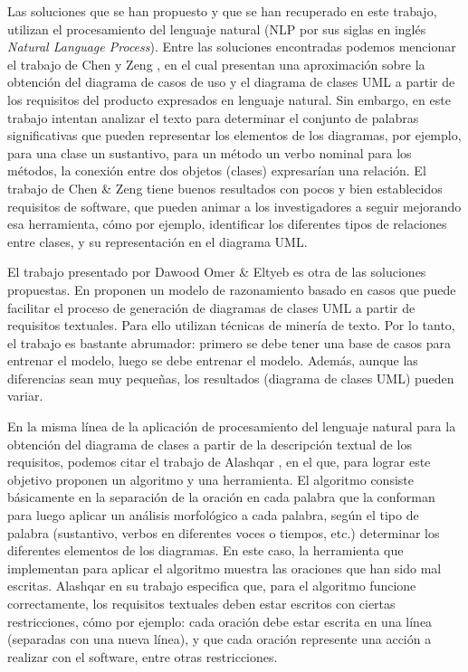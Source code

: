 Las soluciones que se han propuesto y que se han recuperado en este trabajo, utilizan el procesamiento del lenguaje natural (NLP por sus siglas en inglés \textit{Natural Language Process}). Entre las soluciones encontradas podemos mencionar el trabajo de Chen y Zeng \cite{Chen2010}, en el cual presentan una aproximación sobre la obtención del diagrama de casos de uso y el diagrama de clases UML a partir de los requisitos del producto expresados en lenguaje natural. Sin embargo, en este trabajo intentan analizar el texto para determinar el conjunto de palabras significativas que pueden representar los elementos de los diagramas, por ejemplo, para una clase un sustantivo, para un método un verbo nominal para los métodos, la conexión entre dos objetos (clases) expresarían una relación. El trabajo de Chen \& Zeng \cite{Chen2010} tiene buenos resultados con pocos y bien establecidos requisitos de software, que pueden animar a los investigadores a seguir mejorando esa herramienta, cómo por ejemplo, identificar los diferentes tipos de relaciones entre clases, y su representación en el diagrama UML.

El trabajo presentado por Dawood Omer \& Eltyeb \cite{Dawood2022} es otra de las soluciones propuestas. En \cite{Dawood2022} proponen un modelo de razonamiento basado en casos que puede facilitar el proceso de generación de diagramas de clases UML a partir de requisitos textuales. Para ello utilizan técnicas de minería de texto. Por lo tanto, el trabajo es bastante abrumador: primero se debe tener una base de casos para entrenar el modelo, luego se debe entrenar el modelo. Además, aunque las diferencias sean muy pequeñas, los resultados (diagrama de clases UML) pueden variar.

En la misma línea de la aplicación de procesamiento del lenguaje natural para la obtención del diagrama de clases a partir de la descripción textual de los requisitos, podemos citar el trabajo de Alashqar \cite{Alashqar2021}, en el que, para lograr este objetivo proponen un algoritmo y una herramienta. El algoritmo consiste básicamente en la separación de la oración en cada palabra que la conforman para luego aplicar un análisis morfológico a cada palabra, según el tipo de palabra (sustantivo, verbos en diferentes voces o tiempos, etc.) determinar los diferentes elementos de los diagramas. En este caso, la herramienta que implementan para aplicar el algoritmo muestra las oraciones que han sido mal escritas. Alashqar en su trabajo \cite{Alashqar2021} especifica que, para el algoritmo funcione correctamente, los requisitos textuales deben estar escritos con ciertas restricciones, cómo por ejemplo: cada oración debe estar escrita en una línea (separadas con una nueva línea), y que cada oración represente una acción a realizar con el software, entre otras restricciones. 

